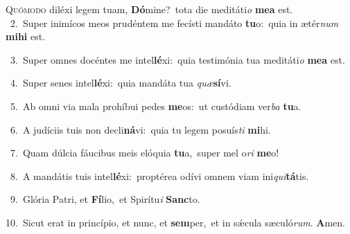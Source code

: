 \lettrine{\initial\textcolor{\initialcolor}{Q}}{uómodo} diléxi legem tuam, \textbf{Dó}\-mine?~\star tota die meditáti\textit{o} \textbf{me}\-\textbf{a} est.\\
{\numbfont\textcolor{\numbcolor}{~2.}}~Super inimícos meos prudéntem me fecísti mandáto \textbf{tu}\-o:~\star quia in ætér\textit{num} \textbf{mi}\-\textbf{hi} est.\par
{\numbfont\textcolor{\numbcolor}{~3.}}~Super omnes docéntes me intel\-\textbf{lé}\-xi:~\star quia testimónia tua meditáti\textit{o} \textbf{me}\-\textbf{a} est.\par
{\numbfont\textcolor{\numbcolor}{~4.}}~Super senes intel\-\textbf{lé}\-xi:~\star quia mandáta tua \textit{quæ}\-\textbf{sí}vi.\par
{\numbfont\textcolor{\numbcolor}{~5.}}~Ab omni via mala prohíbui pedes \textbf{me}\-os:~\star ut custódiam ver\textit{ba} \textbf{tu}\-a.\par
{\numbfont\textcolor{\numbcolor}{~6.}}~A judíciis tuis non decli\-\textbf{ná}\-vi:~\star quia tu legem posuís\textit{ti} \textbf{mi}\-hi.\par
{\numbfont\textcolor{\numbcolor}{~7.}}~Quam dúlcia fáucibus meis elóquia \textbf{tu}\-a,~\star super mel o\textit{ri} \textbf{me}\-o!\par
{\numbfont\textcolor{\numbcolor}{~8.}}~A mandátis tuis intel\-\textbf{lé}\-xi:~\star proptérea odívi omnem viam ini\-\textit{qui}\-\textbf{tá}tis.\par
{\numbfont\textcolor{\numbcolor}{~9.}}~Glória Patri, et \textbf{Fí}\-lio,~\star et Spirítu\textit{i} \textbf{Sanc}\-to.\par
{\numbfont\textcolor{\numbcolor}{10.}}~Sicut erat in princípio, et nunc, et \textbf{sem}\-per,~\star et in sǽcula sæculó\-\textit{rum}\-. \textbf{A}\-men.\par
